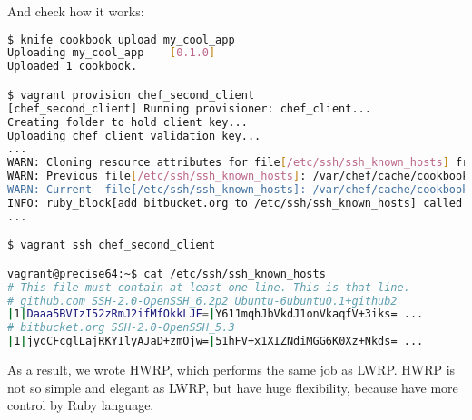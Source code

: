And check how it works:

\begin{lstlisting}[language=Bash,label=lst:cookbook-hwrp12]
$ knife cookbook upload my_cool_app
Uploading my_cool_app    [0.1.0]
Uploaded 1 cookbook.

$ vagrant provision chef_second_client
[chef_second_client] Running provisioner: chef_client...
Creating folder to hold client key...
Uploading chef client validation key...
...
WARN: Cloning resource attributes for file[/etc/ssh/ssh_known_hosts] from prior resource (CHEF-3694)
WARN: Previous file[/etc/ssh/ssh_known_hosts]: /var/chef/cache/cookbooks/my_cool_app/providers/know_host.rb:39:in `insure_for_file'
WARN: Current  file[/etc/ssh/ssh_known_hosts]: /var/chef/cache/cookbooks/my_cool_app/libraries/provider_known_host.rb:62:in `insure_for_file'
INFO: ruby_block[add bitbucket.org to /etc/ssh/ssh_known_hosts] called
...

$ vagrant ssh chef_second_client

vagrant@precise64:~$ cat /etc/ssh/ssh_known_hosts
# This file must contain at least one line. This is that line.
# github.com SSH-2.0-OpenSSH_6.2p2 Ubuntu-6ubuntu0.1+github2
|1|Daaa5BVIzI52zRmJ2ifMfOkkLJE=|Y611mqhJbVkdJ1onVkaqfV+3iks= ...
# bitbucket.org SSH-2.0-OpenSSH_5.3
|1|jycCFcglLajRKYIlyAJaD+zmOjw=|51hFV+x1XIZNdiMGG6K0Xz+Nkds= ...
\end{lstlisting}

As a result, we wrote HWRP, which performs the same job as LWRP. HWRP is not so simple and elegant as LWRP, but have huge flexibility, because have more control by Ruby language.
